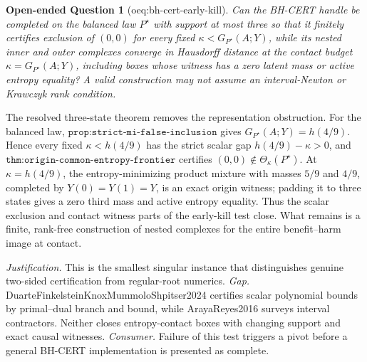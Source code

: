 \documentclass{article}
\newtheorem{openendedquestion}{Open-ended Question}
\begin{document}
\begin{openendedquestion}[oeq:bh-cert-early-kill]\label{oeq:bh-cert-early-kill}
Can the BH-CERT handle be completed on the balanced law \(P^\star\) with support at most three so that it finitely certifies exclusion of \((0,0)\) for every fixed \(\kappa<G_{P^\star}(A;Y)\), while its nested inner and outer complexes converge in Hausdorff distance at the contact budget \(\kappa=G_{P^\star}(A;Y)\), including boxes whose witness has a zero latent mass or active entropy equality? A valid construction may not assume an interval-Newton or Krawczyk rank condition.
\end{openendedquestion}
The resolved three-state theorem removes the representation obstruction.  For the balanced law, \(\texttt{prop:strict-mi-false-inclusion}\) gives \(G_{P^\star}(A;Y)=h(4/9)\).  Hence every fixed \(\kappa<h(4/9)\) has the strict scalar gap \(h(4/9)-\kappa>0\), and \(\texttt{thm:origin-common-entropy-frontier}\) certifies \((0,0)\notin\Theta_\kappa(P^\star)\).  At \(\kappa=h(4/9)\), the entropy-minimizing product mixture with masses \(5/9\) and \(4/9\), completed by \(Y(0)=Y(1)=Y\), is an exact origin witness; padding it to three states gives a zero third mass and active entropy equality.  Thus the scalar exclusion and contact witness parts of the early-kill test close.  What remains is a finite, rank-free construction of nested complexes for the entire benefit--harm image at contact.
\par\smallskip\noindent \textit{Justification.} This is the smallest singular instance that distinguishes genuine two-sided certification from regular-root numerics. \textit{Gap.} DuarteFinkelsteinKnoxMummoloShpitser2024 certifies scalar polynomial bounds by primal--dual branch and bound, while ArayaReyes2016 surveys interval contractors. Neither closes entropy-contact boxes with changing support and exact causal witnesses. \textit{Consumer.} Failure of this test triggers a pivot before a general BH-CERT implementation is presented as complete.
\end{document}
